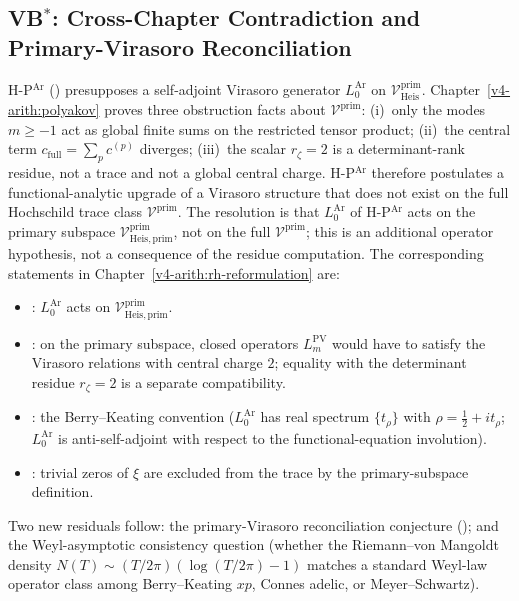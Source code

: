 \subsection{\texorpdfstring{VB\(^{*}\)}{VB*}: Cross-Chapter Contradiction and Primary-Virasoro Reconciliation}

H-P\(^{\mathrm{Ar}}\) () presupposes a
self-adjoint Virasoro generator \(L_{0}^{\mathrm{Ar}}\) on
\(\mathcal{V}^{\mathrm{prim}}_{\mathrm{Heis}}\). Chapter~\ref{v4-arith:polyakov}
proves three obstruction facts about \(\mathcal{V}^{\mathrm{prim}}\):
(i)~only the modes \(m\geq -1\) act as global finite sums on the
restricted tensor product;
(ii)~the central term \(c_{\mathrm{full}}=\sum_{p}c^{(p)}\) diverges;
(iii)~the scalar \(r_{\zeta}=2\) is a determinant-rank residue, not a
trace and not a global central charge.
H-P\(^{\mathrm{Ar}}\) therefore postulates a functional-analytic
upgrade of a Virasoro structure that does not exist on the full
Hochschild trace class \(\mathcal{V}^{\mathrm{prim}}\).
The resolution is that \(L_{0}^{\mathrm{Ar}}\) of H-P\(^{\mathrm{Ar}}\)
acts on the primary subspace
\(\mathcal{V}^{\mathrm{prim}}_{\mathrm{Heis},\mathrm{prim}}\),
not on the full \(\mathcal{V}^{\mathrm{prim}}\); this is an additional
operator hypothesis, not a consequence of the residue computation.
The corresponding statements in
Chapter~\ref{v4-arith:rh-reformulation} are:
\begin{itemize}
\item {}: \(L_{0}^{\mathrm{Ar}}\)
acts on \(\mathcal{V}^{\mathrm{prim}}_{\mathrm{Heis},\mathrm{prim}}\).
\item {}: on the primary
subspace, closed operators \(L_{m}^{\mathrm{PV}}\) would have to
satisfy the Virasoro relations with central charge \(2\); equality with
the determinant residue \(r_{\zeta}=2\) is a separate compatibility.
\item {}: the
Berry--Keating convention
(\(L_{0}^{\mathrm{Ar}}\) has real spectrum \(\{t_{\rho}\}\) with
\(\rho=\tfrac{1}{2}+it_{\rho}\); \(L_{0}^{\mathrm{Ar}}\) is
anti-self-adjoint with respect to the functional-equation involution).
\item {}: trivial zeros of \(\xi\)
are excluded from the trace by the primary-subspace definition.
\end{itemize}
Two new residuals follow: the primary-Virasoro reconciliation conjecture
(); and the Weyl-asymptotic
consistency question (whether the Riemann--von Mangoldt density
\(N(T)\sim(T/2\pi)(\log(T/2\pi)-1)\) matches a standard Weyl-law
operator class among Berry--Keating \(xp\), Connes adelic, or
Meyer--Schwartz).

